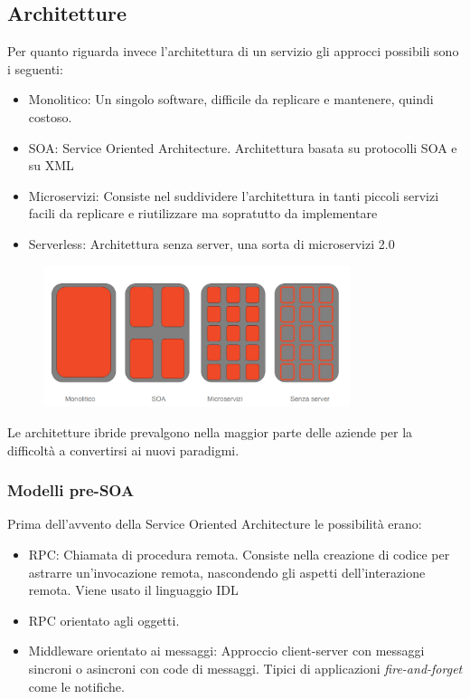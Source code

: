 \documentclass{article}
\begin{document}
		\subsection{Architetture}
		Per quanto riguarda invece l'architettura di un servizio gli approcci possibili sono i seguenti:
		\begin{itemize}
		    \item Monolitico: Un singolo software, difficile da replicare e mantenere, quindi costoso. 
		    \item SOA: Service Oriented Architecture. Architettura basata su protocolli SOA e su XML
		    \item Microservizi: Consiste nel suddividere l'architettura in tanti piccoli servizi facili da replicare e riutilizzare ma sopratutto da implementare
		    \item Serverless: Architettura senza server, una sorta di microservizi 2.0
		\end{itemize}
		
		\begin{figure}[ht]
		\centering
		\includegraphics[width=0.8\textwidth]{SAC_A2_architecture_server.png}
		\end{figure}
		Le architetture ibride prevalgono nella maggior parte delle aziende per la difficoltà a convertirsi ai nuovi paradigmi.
		
		\subsubsection{Modelli pre-SOA}
		
		Prima dell'avvento della Service Oriented Architecture le possibilità erano:
		\begin{itemize}
		    \item RPC: Chiamata di procedura remota. Consiste nella creazione di codice per astrarre un'invocazione remota, nascondendo gli aspetti dell'interazione remota. Viene usato il linguaggio IDL
		    \item RPC orientato agli oggetti.
		    \item Middleware orientato ai messaggi: Approccio client-server con messaggi sincroni o asincroni con code di messaggi. Tipici di applicazioni \textit{fire-and-forget} come le notifiche.
		\end{itemize}
		
\end{document}
